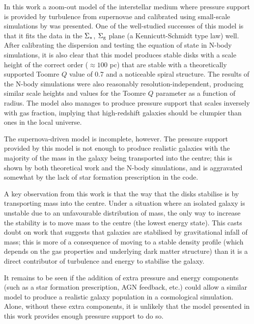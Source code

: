 In this work a zoom-out model of the interstellar medium where pressure support is provided by turbulence from supernovae and calibrated using small-scale simulations by \citet{martizzi_supernova_2015} was presented.
One of the well-studied successes of this model is that it fits the data in the $\Sigma_*$, $\Sigma_\mathrm{g}$ plane (a Kennicutt-Schmidt type law) well.
After calibrating the dispersion and testing the equation of state in N-body simulations, it is also clear that this model produces stable disks with a scale height of the correct order ($\approx 100$ pc) that are stable with a theoretically supported Toomre $Q$ value of 0.7 and a noticeable spiral structure.
The results of the N-body simulations were also reasonably resolution-independent, producing similar scale heights and values for the Toomre $Q$ parameter as a function of radius.
The model also manages to produce pressure support that scales inversely with gas fraction, implying that high-redshift galaxies should be clumpier than ones in the local universe.

The supernova-driven model is incomplete, however.
The pressure support provided by this model is not enough to produce realistic galaxies with the majority of the mass in the galaxy being transported into the centre; this is shown by both theoretical work and the N-body simulations, and is aggravated somewhat by the lack of star formation prescription in the code.

A key observation from this work is that the way that the disks stabilise is by transporting mass into the centre.
Under a situation where an isolated galaxy is unstable due to an unfavourable distribution of mass, the only way to increase the stability is to move mass to the centre (the lowest energy state).
This casts doubt on work that suggests that galaxies are stabilised by gravitational infall of mass; this is more of a consequence of moving to a stable density profile (which depends on the gas properties and underlying dark matter structure) than it is a direct contributor of turbulence and energy to stabilise the galaxy.

It remains to be seen if the addition of extra pressure and energy components (such as a star formation prescription, AGN feedback, etc.) could allow a similar model to produce a realistic galaxy population in a cosmological simulation.
Alone, without these extra components, it is unlikely that the model presented in this work provides enough pressure support to do so.
